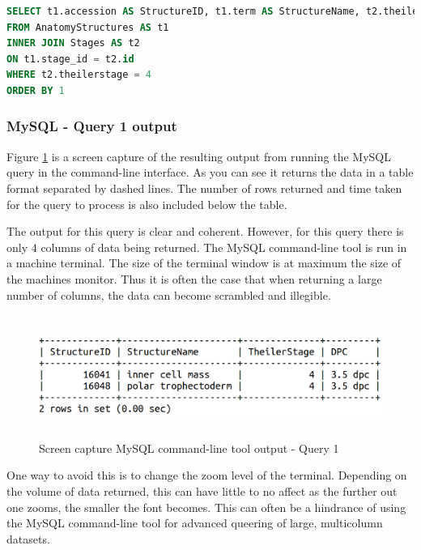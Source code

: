 \begin{lstlisting}[language=SQL, caption=MySQL Query 1 statement. All structures at Theiler Stage 4, label=code:mysqlquery1]
SELECT t1.accession AS StructureID, t1.term AS StructureName, t2.theilerstage AS TheilerStage, t2.dpc AS DPC
FROM AnatomyStructures AS t1
INNER JOIN Stages AS t2
ON t1.stage_id = t2.id
WHERE t2.theilerstage = 4
ORDER BY 1
\end{lstlisting}

\subsubsection*{MySQL - Query 1 output}\label{mysqlquery1output}
Figure \ref{fig:mysqlquery1} is a screen capture of the resulting output from running the MySQL query in the command-line interface. As you can see it returns the data in a table format separated by dashed lines. The number of rows returned and time taken for the query to process is also included below the table.

The output for this query is clear and coherent. However, for this query there is only 4 columns of data being returned. The MySQL command-line tool is run in a machine terminal. The size of the terminal window is at maximum the size of the machines monitor. Thus it is often the case that when returning a large number of columns, the data can become scrambled and illegible.

\begin{figure}[H]\begin{center}\includegraphics[height=4cm,width=0.9\linewidth]{images/mysqlquery1}\caption{Screen capture MySQL command-line tool output - Query 1}\label{fig:mysqlquery1}\end{center}\end{figure}

One way to avoid this is to change the zoom level of the terminal. Depending on the volume of data returned, this can have little to no affect as the further out one zooms, the smaller the font becomes. This can often be a hindrance of using the MySQL command-line tool for advanced queering of large, multicolumn datasets.

